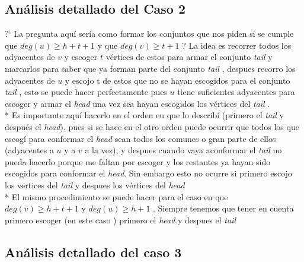 \documentclass[12pt]{article}
\begin{document}
    \subsection{An\'alisis detallado del Caso 2}

    \noindent ?` La pregunta aqu\'i ser\'ia como formar los conjuntos que nos piden si se cumple que $deg (u) \geq h+t+1$  y que $deg(v) \geq t+1$ ? 
    La idea es recorrer todos los adyacentes de $v$ y escoger $t$ v\'ertices de estos para armar el conjunto \textit{tail} y marcarlos para saber
    que ya forman parte del conjunto \textit{tail}  , despues recorro los adyacentes de $u$ y escojo t de estos que no se hayan escogidos para el
    conjunto \textit{tail} , esto se puede hacer perfectamente pues $u$ tiene suficientes adyacentes para escoger y armar el \textit{head} una vez sea
    hayan escogidos los v\'ertices del \textit{tail} . 
    \\*
    Es importante aqu\'i hacerlo en el orden en que lo describ\'i (primero el \textit{tail} y despu\'es el \textit{head}), pues  si se hace en el otro orden 
    puede ocurrir que todos los que escog\'i para conformar el \textit{head} sean todos los comunes  o gran parte de ellos  (adyacentes a $u$ y a $v$ a la vez), 
    y despues cuando vaya aconformar el \textit{tail} no pueda hacerlo porque me faltan por escoger y los restantes ya hayan sido escogidos para conformar el \textit{head}. 
    Sin embargo esto no ocurre si primero escojo los vertices del \textit{tail } y despues los v\'ertices del \textit{head}
    \\*
    El mismo procedimiento se puede hacer para el caso en que $deg (v) \geq h+t+1$ y $deg(u) \geq h+1$ . Siempre tenemos que tener en cuenta primero escoger 
    (en este caso ) primero el \textit{head} y despues el \textit{tail} 
    

    \subsection{An\'alisis detallado del caso 3}
\end{document}
